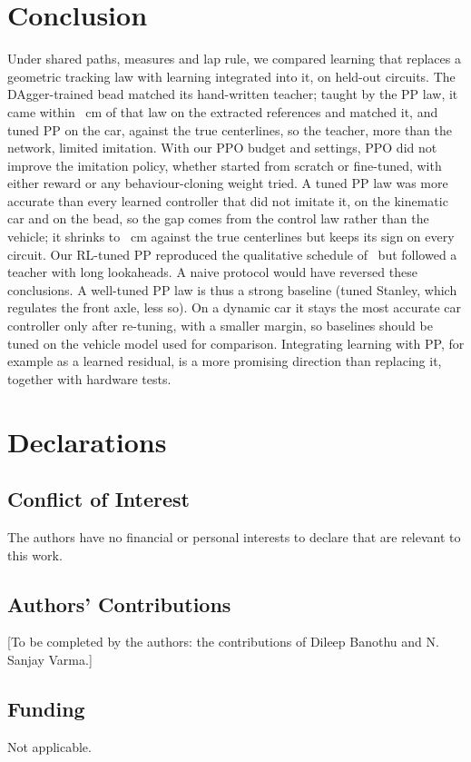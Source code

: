 \documentclass{IJCAS}
\begin{document}
\section{Conclusion}
Under shared paths, measures and lap rule, we compared learning that replaces a geometric tracking law with learning integrated into it, on held-out circuits. The DAgger-trained bead matched its hand-written teacher; taught by the PP law, it came within \VcmpBppTeachDiff~cm of that law on the extracted references and matched it, and tuned PP on the car, against the true centerlines, so the teacher, more than the network, limited imitation. With our PPO budget and settings, PPO did not improve the imitation policy, whether started from scratch or fine-tuned, with either reward or any behaviour-cloning weight tried. A tuned PP law was more accurate than every learned controller that did not imitate it, on the kinematic car and on the bead, so the gap comes from the control law rather than the vehicle; it shrinks to \VtruePoneDiff~cm against the true centerlines but keeps its sign on every circuit. Our RL-tuned PP reproduced the qualitative schedule of~\cite{elgouhary2026} but followed a teacher with long lookaheads. A naive protocol would have reversed these conclusions. A well-tuned PP law is thus a strong baseline (tuned Stanley, which regulates the front axle, less so). On a dynamic car it stays the most accurate car controller only after re-tuning, with a smaller margin, so baselines should be tuned on the vehicle model used for comparison. Integrating learning with PP, for example as a learned residual, is a more promising direction than replacing it, together with hardware tests.

\section*{Declarations}
\subsection*{Conflict of Interest}
The authors have no financial or personal interests to declare that are relevant to this work.

\subsection*{Authors' Contributions}
[To be completed by the authors: the contributions of Dileep Banothu and N. Sanjay Varma.]

\subsection*{Funding}
Not applicable.
\end{document}
